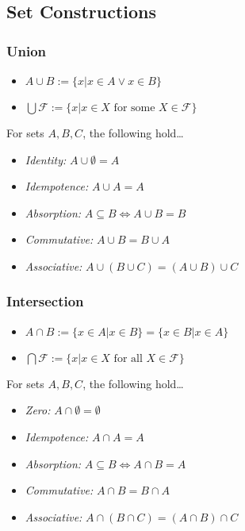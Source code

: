 \subsection{Set Constructions}\label{setconstructions}

\subsubsection{Union}\label{union}
\begin{itemize}
  \item $A\cup B := \{x | x \in A \lor x \in B \}$
  \item $\bigcup \mathcal{F} := \{x | x \in X \textrm{ for some } X \in \mathcal{F} \}$
\end{itemize}

\begin{proposition}
For sets $A,B,C$, the following hold\dots
\begin{itemize}
  \item \emph{Identity:} $A \cup \emptyset = A$
  \item \emph{Idempotence:} $A\cup A = A$
  \item \emph{Absorption:} $A \subseteq B \Leftrightarrow A \cup B = B$
  \item \emph{Commutative:} $A \cup B = B \cup A$
  \item \emph{Associative:} $A \cup (B \cup C) = (A \cup B) \cup C$
\end{itemize}
\end{proposition}
	
\subsubsection{Intersection}\label{intersection}
\begin{itemize}
  \item $A\cap B := \{x \in A | x \in B\} = \{x \in B | x \in A\}$
  \item $\bigcap \mathcal{F} := \{x | x \in X \textrm{ for all } X \in \mathcal{F} \}$
\end{itemize}

\begin{proposition}
For sets $A,B,C$, the following hold\dots
\begin{itemize}
  \item \emph{Zero:} $A \cap \emptyset = \emptyset$
  \item \emph{Idempotence:} $A\cap A = A$
  \item \emph{Absorption:} $A \subseteq B \Leftrightarrow A \cap B = A$
  \item \emph{Commutative:} $A \cap B = B \cap A$
  \item \emph{Associative:} $A \cap (B \cap C) = (A \cap B) \cap C$
\end{itemize}
\end{proposition}

